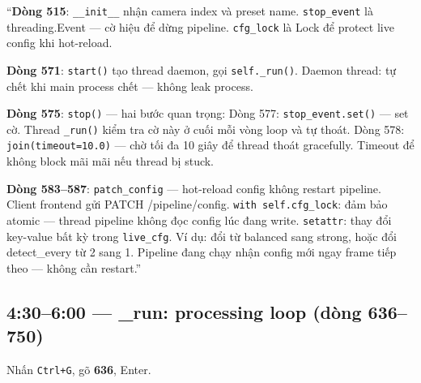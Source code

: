 \documentclass[12pt, a4paper]{article}
\begin{document}
\begin{say}
``\textbf{Dòng 515}: \texttt{\_\_init\_\_} nhận camera index và preset name.
\texttt{stop\_event} là threading.Event --- cờ hiệu để dừng pipeline.
\texttt{cfg\_lock} là Lock để protect live config khi hot-reload.

\textbf{Dòng 571}: \texttt{start()} tạo thread daemon, gọi \texttt{self.\_run()}.
Daemon thread: tự chết khi main process chết --- không leak process.

\textbf{Dòng 575}: \texttt{stop()} --- hai bước quan trọng:
Dòng 577: \texttt{stop\_event.set()} --- set cờ.
Thread \texttt{\_run()} kiểm tra cờ này ở cuối mỗi vòng loop và tự thoát.
Dòng 578: \texttt{join(timeout=10.0)} --- chờ tối đa 10 giây để thread thoát gracefully.
Timeout để không block mãi mãi nếu thread bị stuck.

\textbf{Dòng 583--587}: \texttt{patch\_config} --- hot-reload config không restart pipeline.
Client frontend gửi PATCH /pipeline/config.
\texttt{with self.cfg\_lock}: đảm bảo atomic --- thread pipeline không đọc config lúc đang write.
\texttt{setattr}: thay đổi key-value bất kỳ trong \texttt{live\_cfg}.
Ví dụ: đổi từ balanced sang strong, hoặc đổi detect\_every từ 2 sang 1.
Pipeline đang chạy nhận config mới ngay frame tiếp theo --- không cần restart.''
\end{say}

\subsection{4:30--6:00 --- \_run: processing loop (dòng 636--750)}

\begin{doact}
Nhấn \texttt{Ctrl+G}, gõ \textbf{636}, Enter.
\end{doact}
\end{document}
